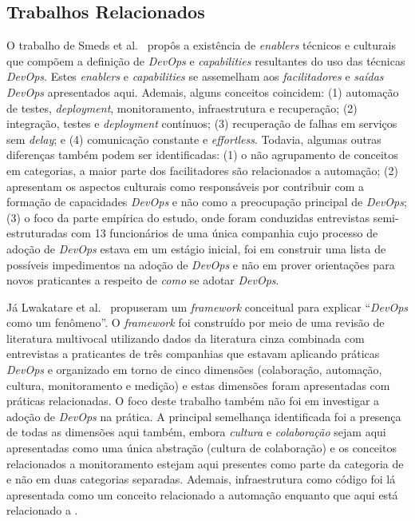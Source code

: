 \subsection{Trabalhos Relacionados}

O trabalho de Smeds et al.~\cite{devops_a_definition} propôs a existência de
{\it enablers} técnicos e culturais que compõem a definição de {\it DevOps} e
{\it capabilities} resultantes do uso das técnicas {\it DevOps}. Estes
{\it enablers} e {\it capabilities} se assemelham aos \emph{facilitadores} e
\emph{saídas DevOps} apresentados aqui. Ademais, alguns conceitos coincidem:
(1) automação de testes, {\it deployment}, monitoramento, infraestrutura e
recuperação; (2) integração, testes e {\it deployment} contínuos; (3) recuperação
de falhas em serviços sem {\it delay}; e (4) comunicação constante e {\it effortless}.
Todavia, algumas outras diferenças também podem ser identificadas: (1) o não
agrupamento de conceitos em categorias, a maior parte dos facilitadores são
relacionados a automação; (2) apresentam os aspectos culturais como responsáveis
por contribuir com a formação de capacidades {\it DevOps} e não como a
preocupação principal de {\it DevOps}; (3) o foco da parte empírica do estudo,
onde foram conduzidas entrevistas semi-estruturadas com 13 funcionários de uma única
companhia cujo processo de adoção de {\it DevOps} estava em um estágio inicial,
foi em construir uma lista de possíveis impedimentos na adoção de {\it DevOps} e
não em prover orientações para novos praticantes a respeito de \emph{como} se
adotar {\it DevOps}.

Já Lwakatare et al.~\cite{dimensions_of_devops,extending_dimensions} propuseram
um {\it framework} conceitual para explicar ``{\it DevOps} como um fenômeno''.
O {\it framework} foi construído por meio de uma revisão de literatura multivocal
utilizando dados da literatura cinza combinada com entrevistas a praticantes de
três companhias que estavam aplicando práticas {\it DevOps} e organizado em
torno de cinco dimensões (colaboração, automação, cultura, monitoramento e
medição) e estas dimensões foram apresentadas com práticas relacionadas. O foco
deste trabalho também não foi em investigar a adoção de {\it DevOps} na prática.
A principal semelhança identificada foi a presença de todas as dimensões aqui
também, embora \emph{cultura} e \emph{colaboração} sejam aqui apresentadas como
uma única abstração (cultura de colaboração) e os conceitos relacionados a
monitoramento estejam aqui presentes como parte da categoria de  e não em duas categorias separadas. Ademais, infraestrutura como
código foi lá apresentada como um conceito relacionado a automação enquanto que
aqui está relacionado a .

